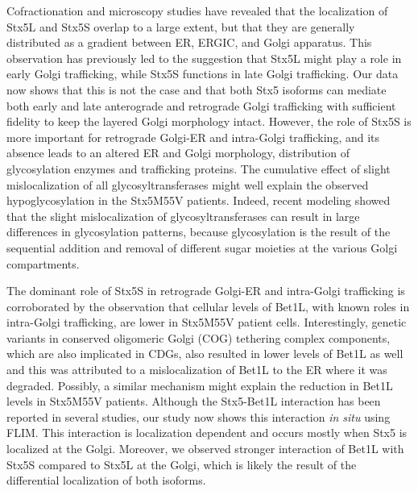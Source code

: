 Cofractionation and microscopy studies have revealed that the localization of Stx5L and Stx5S overlap to a large extent, but that they are generally distributed as a gradient between ER, ERGIC, and Golgi apparatus\cite{dominguez_gp25l/emp24/p24_1998}. This observation has previously led to the suggestion that Stx5L might play a role in early Golgi trafficking, while Stx5S functions in late Golgi trafficking\cite{xu_gs15_2002,dascher_syntaxin_1994,xu_subunit_2000,hay_localization_1998,paek_ers-24_1997,zhang_ykt6_2001,linders_stx5-mediated_2019,tai_participation_2004,hay_mammalian_1996,zhang_mammalian_1997}. Our data now shows that this is not the case and that both Stx5 isoforms can mediate both early and late anterograde and retrograde Golgi trafficking with sufficient fidelity to keep the layered Golgi morphology intact. However, the role of Stx5S is more important for retrograde Golgi-ER and intra-Golgi trafficking, and its absence leads to an altered ER and Golgi morphology, distribution of glycosylation enzymes and trafficking proteins. The cumulative effect of slight mislocalization of all glycosyltransferases might well explain the observed hypoglycosylation in the Stx5M55V patients. Indeed, recent modeling showed that the slight mislocalization of glycosyltransferases can result in large differences in glycosylation patterns, because glycosylation is the result of the sequential addition and removal of different sugar moieties at the various Golgi compartments\cite{jaiman_algorithmic_2018}.

The dominant role of Stx5S in retrograde Golgi-ER and intra-Golgi trafficking is corroborated by the observation that cellular levels of Bet1L, with known roles in intra-Golgi trafficking, are lower in Stx5M55V patient cells. Interestingly, genetic variants in conserved oligomeric Golgi (COG) tethering complex components, which are also implicated in CDGs, also resulted in lower levels of Bet1L as well and this was attributed to a mislocalization of Bet1L to the ER where it was degraded\cite{oka_cog_2004}. Possibly, a similar mechanism might explain the reduction in Bet1L levels in Stx5M55V patients. Although the Stx5-Bet1L interaction has been reported in several studies\cite{malsam_organization_2011,glick_membrane_2009}, our study now shows this interaction \emph{in situ} using FLIM. This interaction is localization dependent and occurs mostly when Stx5 is localized at the Golgi. Moreover, we observed stronger interaction of Bet1L with Stx5S compared to Stx5L at the Golgi, which is likely the result of the differential localization of both isoforms.

